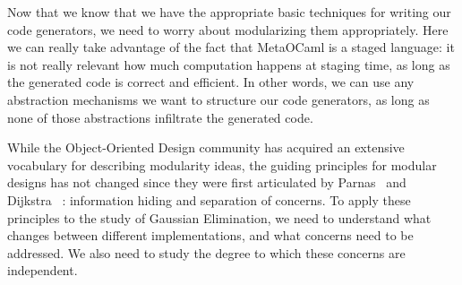 \documentclass{llncs}
\begin{document}
Now that we know that we have the appropriate basic techniques for
writing our code generators, we need to worry about modularizing them
appropriately.  Here we can really take advantage of the fact that
MetaOCaml is a staged language: it is not really relevant how much
computation happens at staging time, as long as the generated code
is correct and efficient.  In other words, we can use any abstraction
mechanisms we want to structure our code generators, as long as none
of those abstractions infiltrate the generated code.

While the Object-Oriented Design community has acquired an extensive
vocabulary for describing modularity ideas, the guiding principles for
modular designs has not changed since they were first articulated by
Parnas~\cite{journals/cacm/parnas72a} and Dijkstra~
\cite{EWD:EWD447}: information hiding and separation of concerns.  To
apply these principles to the study of Gaussian Elimination, we need
to understand what changes between different implementations, and 
what concerns need to be addressed.  We also need to study the degree
to which these concerns are independent.
\end{document}
